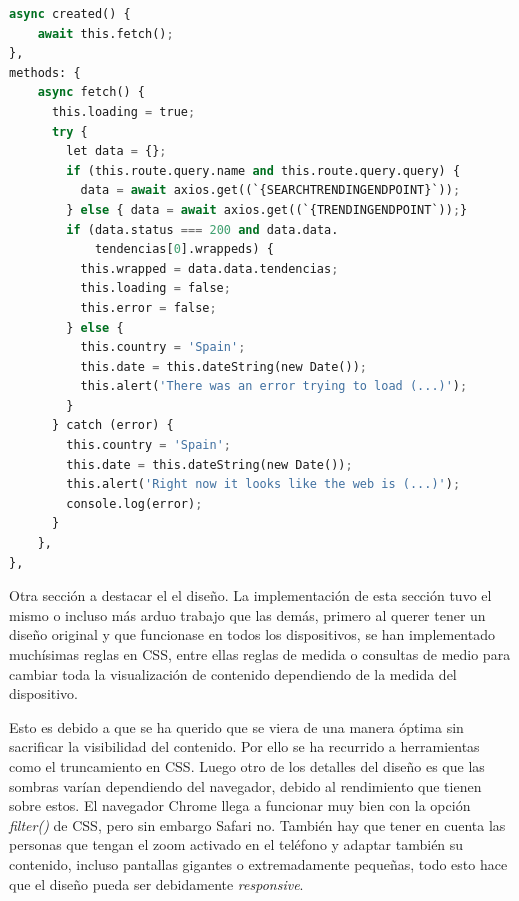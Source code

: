 \vspace{0.3cm}

\begin{lstlisting}[caption=Funciones de carga de contenido en Vue,language=Python, mathescape=true]
async created() {
    await this.fetch();
},
methods: {
    async fetch() {
      this.loading = true;
      try {
        let data = {};
        if (this.route.query.name and this.route.query.query) {
          data = await axios.get((`{SEARCHTRENDINGENDPOINT}`));
        } else { data = await axios.get((`{TRENDINGENDPOINT`));}
        if (data.status === 200 and data.data.
            tendencias[0].wrappeds) {
          this.wrapped = data.data.tendencias;
          this.loading = false;
          this.error = false;
        } else {
          this.country = 'Spain';
          this.date = this.dateString(new Date());
          this.alert('There was an error trying to load (...)');
        }
      } catch (error) {
        this.country = 'Spain';
        this.date = this.dateString(new Date());
        this.alert('Right now it looks like the web is (...)');
        console.log(error);
      }
    },
},
\end{lstlisting}

Otra sección a destacar el el diseño. La implementación de esta sección tuvo el mismo o incluso más arduo trabajo que las demás, primero al querer tener un diseño original y que funcionase en todos los dispositivos, se han implementado muchísimas reglas en CSS, entre ellas reglas de medida o consultas de medio para cambiar toda la visualización de contenido dependiendo de la medida del dispositivo. 

\vspace{0.3cm}

Esto es debido a que se ha querido que se viera de una manera óptima sin sacrificar la visibilidad del contenido. Por ello se ha recurrido a herramientas como el truncamiento en CSS. Luego otro de los detalles del diseño es que las sombras varían dependiendo del navegador, debido al rendimiento que tienen sobre estos. El navegador Chrome llega a funcionar muy bien con la opción \textit{filter()} de CSS, pero sin embargo Safari no. También hay que tener en cuenta las personas que tengan el zoom activado en el teléfono y adaptar también su contenido, incluso pantallas gigantes o extremadamente pequeñas, todo esto hace que el diseño pueda ser debidamente \textit{responsive}.

\vspace{0.3cm}

